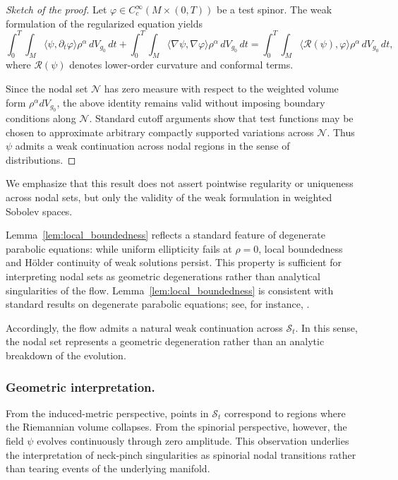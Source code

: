\documentclass[11pt, reqno, a4paper]{amsart}
\theoremstyle{definition}
\theoremstyle{remark}
\begin{document}
\begin{proof}[Sketch of the proof]
Let $\varphi \in C_c^\infty(M \times (0,T))$ be a test spinor.
The weak formulation of the regularized equation yields
\[
\int_0^T \!\!\int_M
\langle \psi, \partial_t \varphi \rangle \rho^\alpha\, dV_{g_0}\, dt
+
\int_0^T \!\!\int_M
\langle \nabla \psi, \nabla \varphi \rangle \rho^\alpha\, dV_{g_0}\, dt
= \int_0^T \!\!\int_M
\langle \mathcal{R}(\psi), \varphi \rangle \rho^\alpha\, dV_{g_0}\, dt,
\]
where $\mathcal{R}(\psi)$ denotes lower-order curvature and conformal terms.

Since the nodal set $\mathcal{N}$ has zero measure with respect to the weighted
volume form $\rho^\alpha dV_{g_0}$, the above identity remains valid without
imposing boundary conditions along $\mathcal{N}$.
Standard cutoff arguments show that test functions may be chosen to
approximate arbitrary compactly supported variations across $\mathcal{N}$.
Thus $\psi$ admits a weak continuation across nodal regions in the sense of
distributions.
\end{proof}

We emphasize that this result does not assert pointwise regularity or
uniqueness across nodal sets, but only the validity of the weak formulation
in weighted Sobolev spaces.

Lemma~\ref{lem:local_boundedness} reflects a standard feature of degenerate
parabolic equations: while uniform ellipticity fails at $\rho=0$, local boundedness and Hölder continuity of weak solutions persist.
This property is sufficient for interpreting nodal sets as geometric degenerations rather than analytical singularities of the flow. Lemma~\ref{lem:local_boundedness} is consistent with standard results on
degenerate parabolic equations; see, for instance,
\cite{CarrollShowalter1983,Ladyzenskaja1968,Evans2010}.

Accordingly, the flow admits a natural weak continuation across $\mathcal{S}_t$.
In this sense, the nodal set represents a geometric degeneration rather than an
analytic breakdown of the evolution.

\subsubsection{Geometric interpretation.}
From the induced-metric perspective, points in $\mathcal{S}_t$ correspond to regions where the Riemannian volume collapses. From the spinorial perspective, however, the field $\psi$ evolves continuously through zero amplitude. This observation underlies the interpretation of neck-pinch singularities as spinorial nodal transitions rather than tearing events of the underlying manifold.
\end{document}
